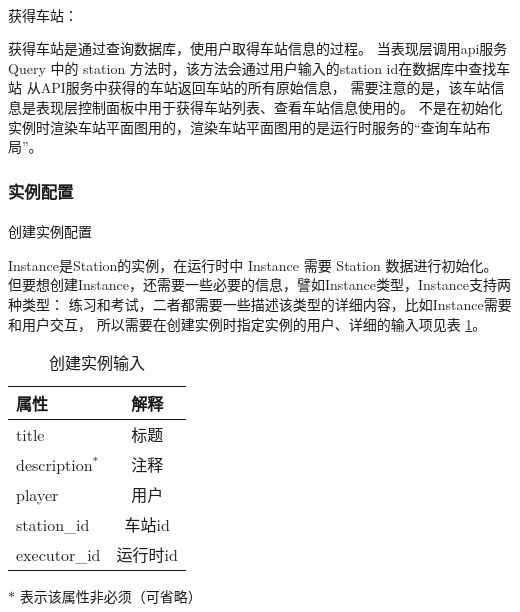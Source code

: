 \paragraph{}获得车站：

获得车站是通过查询数据库，使用户取得车站信息的过程。
当表现层调用api服务 Query 中的 station 方法时，该方法会通过用户输入的station id在数据库中查找车站
从API服务中获得的车站返回车站的所有原始信息，
需要注意的是，该车站信息是表现层控制面板中用于获得车站列表、查看车站信息使用的。
不是在初始化实例时渲染车站平面图用的，渲染车站平面图用的是运行时服务的“查询车站布局”。

\subsubsection{实例配置}

\paragraph{}创建实例配置

Instance是Station的实例，在运行时中 Instance 需要 Station 数据进行初始化。
但要想创建Instance，还需要一些必要的信息，譬如Instance类型，Instance支持两种类型：
练习和考试，二者都需要一些描述该类型的详细内容，比如Instance需要和用户交互，
所以需要在创建实例时指定实例的用户、详细的输入项见表 \ref{create_ins_in}。

\begin{table}[htpb!]
    \centering
    \caption{\label{create_ins_in}创建实例输入}
    \begin{threeparttable}
        \begin{tabular}{lc}
            \toprule
            属性            & 解释     \\
            \midrule
            title           & 标题     \\
            description$^*$ & 注释     \\
            player          & 用户     \\
            station\_id     & 车站id   \\
            executor\_id    & 运行时id \\
            \bottomrule
        \end{tabular}
        \begin{tablenotes}
            \footnotesize
            \item[$*$] 表示该属性非必须（可省略）
        \end{tablenotes}
    \end{threeparttable}
\end{table}

